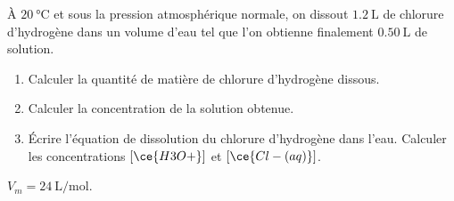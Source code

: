 À $\qty{20}{\degreeCelsius}$ et sous la pression atmosphérique normale, on
dissout $\qty{1.2}{\L}$ de chlorure d'hydrogène dans un volume d'eau tel que
l'on obtienne finalement $\qty{0.50}{\L}$ de solution.
\begin{enumerate}
    \item Calculer la quantité de matière de chlorure d'hydrogène dissous.
    \item Calculer la concentration de la solution obtenue.
    \item Écrire l'équation de dissolution du chlorure d'hydrogène dans l'eau.
          Calculer les concentrations $[\ce{H3O+}]$ et
          $[\ce{Cl-(aq)}]$.
\end{enumerate}
\begin{donnees}
    $V_{m}=\qty{24}{\L\per\mol}$.
\end{donnees}

